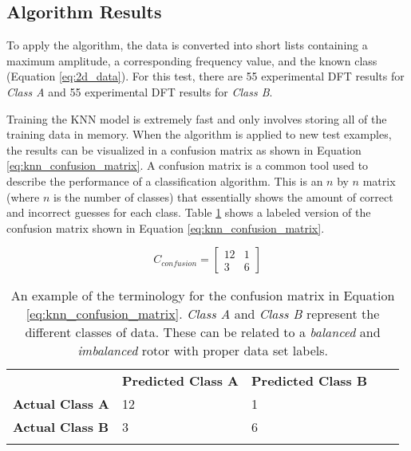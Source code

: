 \subsection{Algorithm Results}
To apply the algorithm, the data is converted into short lists containing a maximum amplitude, a corresponding frequency value, and the known class (Equation \ref{eq:2d_data}). For this test, there are 55 experimental DFT results for \textit{Class A} and 55 experimental DFT results for \textit{Class B}. 

Training the KNN model is extremely fast and only involves storing all of the training data in memory.  When the algorithm is applied to new test examples, the results can be visualized in a confusion matrix \cite{confusion_matrix} as shown in Equation \ref{eq:knn_confusion_matrix}.  A confusion matrix is a common tool used to describe the performance of a classification algorithm.  This is an $n$ by $n$ matrix (where $n$ is the number of classes) that essentially shows the amount of correct and incorrect guesses for each class.  Table \ref{t:confusion_matrix_ex} shows a labeled version of the confusion matrix shown in Equation \ref{eq:knn_confusion_matrix}.

\begin{equation} \label{eq:knn_confusion_matrix}
C_{confusion} = 
\begin{bmatrix}
	12 & 1 \\
	3 & 6
\end{bmatrix}
\end{equation}

\begin{table}[]
\centering
\caption{An example of the terminology for the confusion matrix in Equation \ref{eq:knn_confusion_matrix}. \textit{Class A} and \textit{Class B} represent the different classes of data.  These can be related to a \textit{balanced} and \textit{imbalanced} rotor with proper data set labels.}
\label{t:confusion_matrix_ex}
\vspace*{0.2in}
\begin{tabular}{lllll}
\cline{2-3}
\multicolumn{1}{l|}{}                      & \multicolumn{1}{l|}{\textbf{Predicted Class A}} & \multicolumn{1}{l|}{\textbf{Predicted Class B}} &  &  \\ \cline{1-3}
\multicolumn{1}{|l|}{\textbf{Actual Class A}}  & \multicolumn{1}{l|}{12}                     & \multicolumn{1}{l|}{1}                       &  &  \\ \cline{1-3}
\multicolumn{1}{|l|}{\textbf{Actual Class B}} & \multicolumn{1}{l|}{3}                      & \multicolumn{1}{l|}{6}                       &  &  \\ \cline{1-3}
                                           &                                             &                                              &  & 
\end{tabular}
\end{table}


